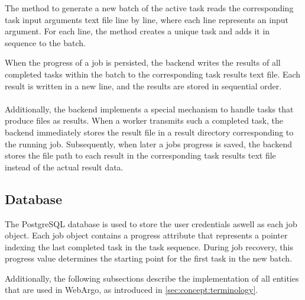 The method to generate a new batch of the active task reads the corresponding task input arguments text file line by line, where each line represents an input argument. For each line, the method creates a unique task and adds it in sequence to the batch.

When the progress of a job is persisted, the backend writes the results of all completed tasks within the batch to the corresponding task results text file. Each result is written in a new line, and the results are stored in sequential order.
\\~\\
Additionally, the backend implements a special mechanism to handle tasks that produce files as results. When a worker transmits such a completed task, the backend immediately stores the result file in a result directory corresponding to the running job. Subsequently, when later a jobs progress is saved, the backend stores the file path to each result in the corresponding task results text file instead of the actual result data.

\subsection{Database}
The PostgreSQL \cite{methodology:db} database is used to store the user credentials aswell as each job object. Each job object contains a progress attribute that represents a pointer indexing the last completed task in the task sequence. During job recovery, this progress value determines the starting point for the first task in the new batch.

Additionally, the following subsections describe the implementation of all entities that are used in WebArgo, as introduced in \autoref{sec:concept:terminology}.

